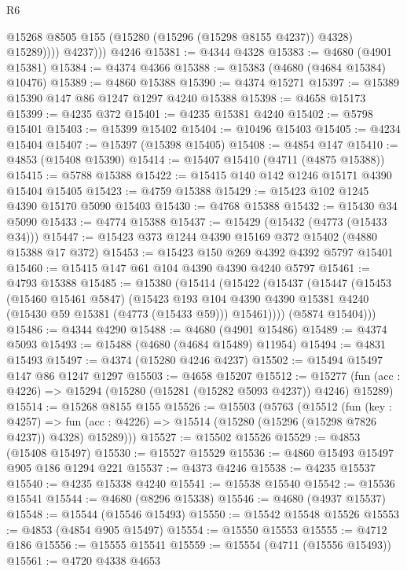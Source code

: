\begin{lexlean}{R6}
\begin{coremodule}
              @15268 @8505 @155 (@15280 (@15296 (@15298 @8155 @4237)) @4328) @15289))))
          @4237)))
    @4246
@15381 := @4344 @4328
@15383 := @4680 (@4901 @15381)
@15384 := @4374 @4366
@15388 := @15383 (@4680 (@4684 @15384) @10476)
@15389 := @4860 @15388
@15390 := @4374 @15271
@15397 := @15389 @15390 @147 @86 @1247 @1297 @4240 @15388
@15398 := @4658 @15173
@15399 := @4235 @372
@15401 := @4235 @15381 @4240
@15402 := @5798 @15401
@15403 := @15399 @15402
@15404 := @10496 @15403
@15405 := @4234 @15404
@15407 := @15397 (@15398 @15405)
@15408 := @4854 @147
@15410 := @4853 (@15408 @15390)
@15414 := @15407 @15410 (@4711 (@4875 @15388))
@15415 := @5788 @15388
@15422 := @15415 @140 @142 @1246 @15171 @4390 @15404 @15405
@15423 := @4759 @15388
@15429 := @15423 @102 @1245 @4390 @15170 @5090 @15403
@15430 := @4768 @15388
@15432 := @15430 @34 @5090
@15433 := @4774 @15388
@15437 := @15429 (@15432 (@4773 (@15433 @34)))
@15447 := @15423 @373 @1244 @4390 @15169 @372 @15402 (@4880 @15388 @17 @372)
@15453 := @15423 @150 @269 @4392 @4392 @5797 @15401
@15460 := @15415 @147 @61 @104 @4390 @4390 @4240 @5797
@15461 := @4793 @15388
@15485 := @15380
    (@15414
      (@15422
        (@15437
          (@15447
            (@15453
              (@15460 @15461 @5847)
              (@15423
                @193
                @104
                @4390
                @4390
                @15381
                @4240
                (@15430 @59 @15381 (@4773 (@15433 @59)))
                @15461))))
        (@5874 @15404)))
@15486 := @4344 @4290
@15488 := @4680 (@4901 @15486)
@15489 := @4374 @5093
@15493 := @15488 (@4680 (@4684 @15489) @11954)
@15494 := @4831 @15493
@15497 := @4374 (@15280 @4246 @4237)
@15502 := @15494 @15497 @147 @86 @1247 @1297
@15503 := @4658 @15207
@15512 := @15277 (fun (acc : @4226) => @15294 (@15280 (@15281 (@15282 @5093 @4237)) @4246) @15289)
@15514 := @15268 @8155 @155
@15526 := @15503
    (@5763
      (@15512
        (fun (key : @4257) =>
        fun (acc : @4226) => @15514 (@15280 (@15296 (@15298 @7826 @4237)) @4328) @15289)))
@15527 := @15502 @15526
@15529 := @4853 (@15408 @15497)
@15530 := @15527 @15529
@15536 := @4860 @15493 @15497 @905 @186 @1294 @221
@15537 := @4373 @4246
@15538 := @4235 @15537
@15540 := @4235 @15338 @4240
@15541 := @15538 @15540
@15542 := @15536 @15541
@15544 := @4680 (@8296 @15338)
@15546 := @4680 (@4937 @15537)
@15548 := @15544 (@15546 @15493)
@15550 := @15542 @15548 @15526
@15553 := @4853 (@4854 @905 @15497)
@15554 := @15550 @15553
@15555 := @4712 @186
@15556 := @15555 @15541
@15559 := @15554 (@4711 (@15556 @15493))
@15561 := @4720 @4338 @4653

\end{coremodule}
\end{lexlean}
